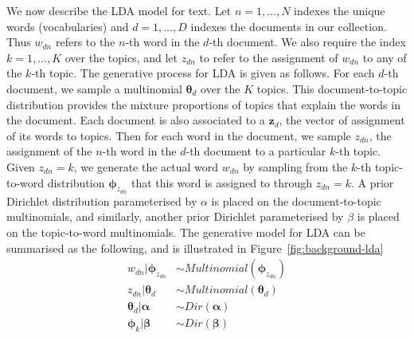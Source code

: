 We now describe the LDA model for text. Let $n=1,...,N$ indexes the unique words (vocabularies) and $d=1,...,D$ indexes the documents in our collection. Thus $w_{dn}$ refers to the $n$-th word in the $d$-th document. We also require the index $k=1,...,K$ over the topics, and let $z_{dn}$ to refer to the assignment of $w_{dn}$ to any of the $k$-th topic. The generative process for LDA is given as follows. For each $d$-th document, we sample a multinomial $\boldsymbol{\theta}_{d}$ over the $K$ topics. This document-to-topic distribution provides the mixture proportions of topics that explain the words in the document. Each document is also associated to a $\boldsymbol{z}_d$, the vector of assignment of its words to topics. Then for each word in the document, we sample $z_{dn}$, the assignment of the $n$-th word in the $d$-th document to a particular $k$-th topic. Given $z_{dn}=k$, we generate the actual word $w_{dn}$ by sampling from the $k$-th topic-to-word distribution $\boldsymbol{\phi}_{z_{dn}}$ that this word is assigned to through $z_{dn}=k$. A prior Dirichlet distribution parameterised by $\alpha$ is placed on the document-to-topic multinomials, and similarly, another prior Dirichlet parameterised by $\beta$ is placed on the topic-to-word multinomials. The generative model for LDA can be summarised as the following, and is illustrated in Figure~\ref{fig:background-lda}
\begin{equation}
\begin{aligned}
w_{dn} \vert \boldsymbol{\phi}_{z_{dn}} &\sim Multinomial(\boldsymbol{\phi}_{z_{dn}}) \\
z_{dn} \vert \boldsymbol{\theta}_{d}      &\sim Multinomial(\boldsymbol{\theta}_{d}) \\
\boldsymbol{\theta}_{d} \vert \boldsymbol{\alpha}                &\sim Dir(\boldsymbol{\alpha}) \\ 
\boldsymbol{\phi}_{k} \vert \boldsymbol{\beta}                     &\sim Dir(\boldsymbol{\beta})
\end{aligned}
\label{eq:background-lda-model}
\end{equation}

